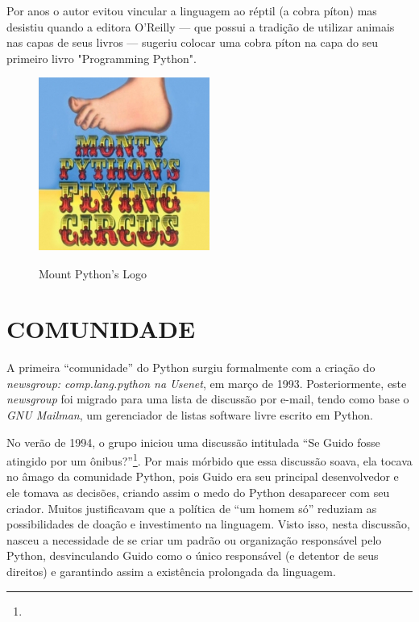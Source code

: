 Por anos o autor evitou vincular a linguagem ao réptil (a cobra píton) mas desistiu quando a editora O’Reilly — que possui a tradição de utilizar animais nas capas de seus livros — sugeriu colocar uma cobra píton na capa do seu primeiro livro "Programming Python".
\begin{figure}[!htb]
    \centering
    \caption{Mount Python’s Logo}
    \includegraphics[width=0.5\textwidth]{./dados/figuras/mount-python.png}
    \label{fig:figura-mountPython}
\end{figure}

\section{COMUNIDADE}

A primeira “comunidade” do Python surgiu formalmente com a criação do \textit{newsgroup: comp.lang.python na Usenet}, em março de 1993.
Posteriormente, este \textit{newsgroup} foi migrado para uma lista de discussão por e-mail, tendo como base o \textit{GNU Mailman}, um gerenciador de listas software livre escrito em Python.
\par No verão de 1994, o grupo iniciou uma discussão intitulada “Se Guido fosse atingido por um ônibus?”\footnote{
}.
Por mais mórbido que essa discussão soava, ela tocava no âmago da comunidade Python, pois Guido era seu principal desenvolvedor e ele tomava as decisões, criando assim o medo do Python desaparecer com seu criador.
Muitos justificavam que a política de “um homem só” reduziam as possibilidades de doação e investimento na linguagem.
Visto isso, nesta discussão, nasceu a necessidade de se criar um padrão ou organização responsável pelo Python, desvinculando Guido como o único responsável (e detentor de seus direitos) e garantindo assim a existência prolongada da linguagem.
 
